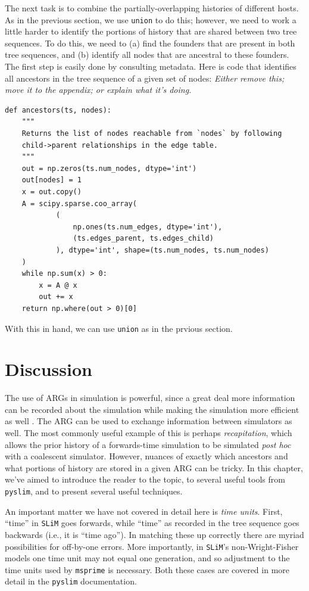 \documentclass[12pt]{article}
\newcommand{\msprime}[0]{\texttt{msprime}\xspace}
\newcommand{\slim}[0]{\texttt{SLiM}\xspace}
\newcommand{\pyslim}[0]{\texttt{pyslim}\xspace}
\newcommand{\comment}[1]{\textit{\color{green} #1}}
\begin{document}
The next task is to combine the partially-overlapping histories of different hosts.
As in the previous section, we use \verb|union| to do this;
however, we need to work a little harder
to identify the portions of history that are shared between two tree sequences.
To do this, we need to
(a) find the founders that are present in both tree sequences,
and (b) identify all nodes that are ancestral to these founders.
The first step is easily done by consulting metadata.
Here is code that identifies all ancestors in the tree sequence
of a given set of nodes:
\comment{Either remove this; move it to the appendix; or explain what it's doing.}
\begin{verbatim}
def ancestors(ts, nodes):
    """
    Returns the list of nodes reachable from `nodes` by following
    child->parent relationships in the edge table.
    """
    out = np.zeros(ts.num_nodes, dtype='int')
    out[nodes] = 1
    x = out.copy()
    A = scipy.sparse.coo_array(
            (
                np.ones(ts.num_edges, dtype='int'),
                (ts.edges_parent, ts.edges_child)
            ), dtype='int', shape=(ts.num_nodes, ts.num_nodes)
    )
    while np.sum(x) > 0:
        x = A @ x
        out += x
    return np.where(out > 0)[0]
\end{verbatim}
With this in hand, we can use \verb|union|
as in the prvious section.


\section*{Discussion}

The use of ARGs in simulation is powerful,
since a great deal more information can be recorded about the simulation
while making the simulation more efficient as well \citep{kelleher2016efficient}.
The ARG can be used to exchange information between simulators as well.
The most commonly useful example of this is perhaps \emph{recapitation},
which allows the prior history of a forwards-time simulation
to be simulated \emph{post hoc} with a coalescent simulator.
However, nuances of exactly which ancestors and what portions of history
are stored in a given ARG can be tricky.
In this chapter, we've aimed to introduce the reader to the topic,
to several useful tools from \pyslim,
and to present several useful techniques.

An important matter we have not covered in detail here is \emph{time units}.
First, ``time'' in \slim goes forwards, while ``time'' as recorded in the tree sequence goes backwards (i.e., it is ``time ago'').
In matching these up correctly there are myriad possibilities for off-by-one errors.
More importantly, in \slim's non-Wright-Fisher models one time unit may not equal one generation,
and so adjustment to the time units used by \msprime is necessary.
Both these cases are covered in more detail in the \pyslim documentation.
\end{document}
